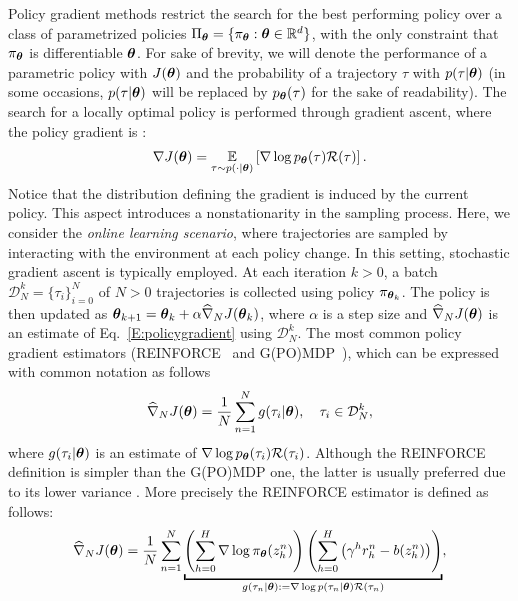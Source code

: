 Policy gradient methods restrict the search for the best performing policy over a class of parametrized policies $\Pi_{\vtheta}=\{\pol: \vtheta \in \realspace^d\}$, with the only constraint that $\pol$ is differentiable \wrt $\vtheta$. For sake of brevity, we will denote the performance of a parametric policy with $J(\vtheta)$ and the probability of a trajectory $\tau$ with $p(\tau|\vtheta)$ (in some occasions, $p(\tau|\vtheta)$ will be replaced by $p_{\vtheta}(\tau)$ for the sake of readability).
The search for a locally optimal policy is performed through gradient ascent, where the policy gradient
is \citep{sutton2000policy, Peters2008reinf}:
\begin{align} \label{E:policygradient}
	\gradJ{\vtheta} = \EVV[\tau \sim p(\cdot|\vtheta)]{\score{\vtheta}{\tau}\Reward(\tau)}.
\end{align}
Notice that the distribution defining the gradient is induced by the current policy. This aspect introduces a nonstationarity in the sampling process.
Here, we consider the \emph{online learning scenario}, where trajectories are sampled by interacting with the environment at each policy change. 
In this setting, stochastic gradient ascent is typically employed.
At each iteration $k >0$, a batch $\mathcal{D}_N^k = \{\tau_i\}_{i=0}^N$ of $N>0$ trajectories is collected using policy $\pi_{\vtheta_k}$.
The policy is then updated as $\vtheta_{k+1}  = \vtheta_k + \alpha\gradApp{\vtheta_k}{N}$, where $\alpha$ is a step size and $\gradApp{\vtheta}{N}$ is an estimate of Eq.~\eqref{E:policygradient} using $\mathcal{D}_N^k$. The most common policy gradient estimators (\eg REINFORCE~\citep{williams1992simple} and G(PO)MDP~\citep{baxter2001infinite}), which can be expressed with common notation as follows
\begin{align} \label{E:policygradient.estimate}
	\gradApp{\vtheta}{N} = \frac{1}{N}\sum_{n=1}^{N} g(\tau_i|\vtheta), \quad \tau_i \in \mathcal{D}_N^k,
\end{align}
where $g(\tau_i|\vtheta)$ is an estimate of $\score{\vtheta}{\tau_i}\Reward(\tau_i)$.
Although the REINFORCE definition is simpler than the G(PO)MDP one, the latter is usually preferred due to its lower variance \citep{zhao2011analysis}. More precisely the REINFORCE estimator is defined as follows:
\begin{align*}
\gradApp{\vtheta}{N} = \frac{1}{N}\sum_{n=1}^{N}
\underbracket{
	\left(\sum_{h=0}^{H}\nabla \log \pol(z_h^n) \right)\left(\sum_{h=0}^{H}\left(\gamma^h 
	r_h^n
	- b(z_h^n)\right)\right)
}_{g(\tau_n|\vtheta):=\nabla \log p(\tau_n|\vtheta)\Reward(\tau_n)}
,
\end{align*}
